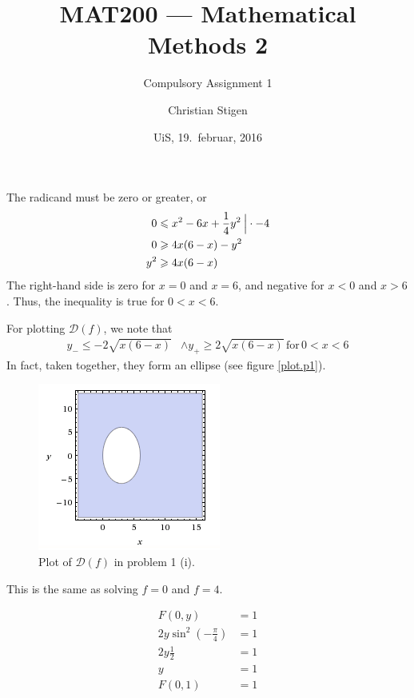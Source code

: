 \documentclass[a4paper,norsk,12pt]{article}
\title{MAT200 --- Mathematical Methods 2}
\subtitle{Compulsory Assignment 1}
\author{Christian Stigen}
\date{UiS, 19.~februar, 2016}
\begin{document}
\maketitle

\label{problem.1}

The radicand must be zero or greater, or
\begin{align*}
  0 & \leqslant x^2-6x+\frac{1}{4}y^2 \> \Big{|} \cdot-4 \\
  0 & \geqslant 4x(6-x)-y^2 \\
  y^2 & \geqslant 4x(6-x)
\end{align*}
The right-hand side is zero for $x=0$ and $x=6$, and negative for $x<0$
and $x>6$. Thus, the inequality is true for $0 < x < 6$.

For plotting $\mathcal{D}(f)$, we note that
\begin{align*}
  y_{-} \leqslant -2\sqrt{x(6-x)} & \wedge y_{+} \geqslant 2\sqrt{x(6-x)}
  \,\text{for}\, 0<x<6
\end{align*}
In fact, taken together, they form an ellipse (see figure \vref{plot.p1}).

\begin{figure}[h]
  \centering
  \includegraphics{ob1plot.png}
  \caption{Plot of $\mathcal{D}(f)$ in problem 1 (i).}
  \label{plot.p1}
\end{figure}


This is the same as solving $f=0$ and $f=4$.









\begin{align*}
  F(0,y) &= 1 \\
  2y \sin^2(-\frac{\pi}{4}) &= 1 \\
  2y\frac{1}{2} &= 1 \\
  y &= 1 \\
  F(0,1) &= 1
\end{align*}
\end{document}
